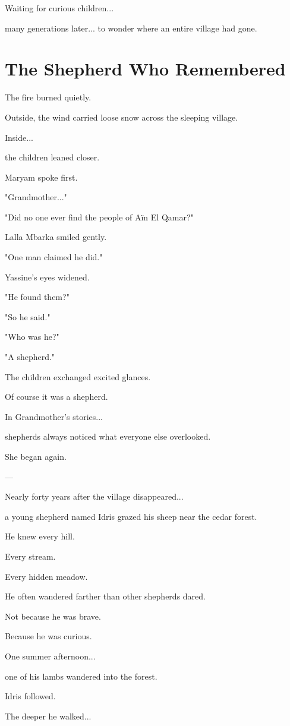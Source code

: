 \documentclass[12pt,openany]{book}
\begin{document}
Waiting for curious children...

many generations later...
to wonder where an entire village had gone.
\section*{The Shepherd Who Remembered}

The fire burned quietly.

Outside, the wind carried loose snow across the sleeping village.

Inside...

the children leaned closer.

Maryam spoke first.

"Grandmother..."

"Did no one ever find the people of Aïn El Qamar?"

Lalla Mbarka smiled gently.

"One man claimed he did."

Yassine's eyes widened.

"He found them?"

"So he said."

"Who was he?"

"A shepherd."

The children exchanged excited glances.

Of course it was a shepherd.

In Grandmother's stories...

shepherds always noticed what everyone else overlooked.

She began again.

---

Nearly forty years after the village disappeared...

a young shepherd named Idris grazed his sheep near the cedar forest.

He knew every hill.

Every stream.

Every hidden meadow.

He often wandered farther than other shepherds dared.

Not because he was brave.

Because he was curious.

One summer afternoon...

one of his lambs wandered into the forest.

Idris followed.

The deeper he walked...
\end{document}

